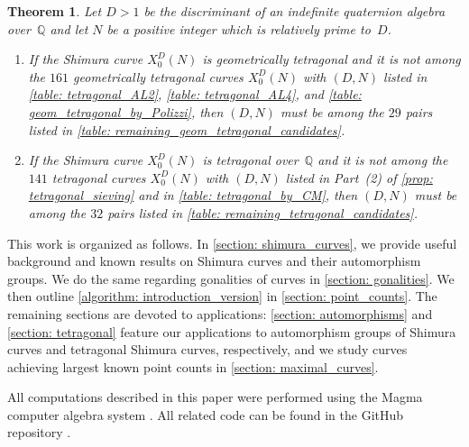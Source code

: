 \documentclass[11pt,reqno]{amsart}
\newcommand{\Q}{\mathbb{Q}}
\newtheorem{theorem}{Theorem}[section]
\theoremstyle{definition}
\begin{document}
\begin{theorem}\label{theorem: tetragonal_introduction}
Let $D>1$ be the discriminant of an indefinite quaternion algebra over~$\mathbb{Q}$ and let $N$ be a positive integer which is relatively prime to~$D$. 
\begin{enumerate}
    \item If the Shimura curve $X_0^D(N)$ is geometrically tetragonal and it is not among the $161$ geometrically tetragonal curves $X_0^D(N)$ with $(D,N)$ listed in \cref{table: tetragonal_AL2}, \cref{table: tetragonal_AL4}, and \cref{table: geom_tetragonal_by_Polizzi}, then $(D,N)$ must be among the $29$ pairs listed in \cref{table: remaining_geom_tetragonal_candidates}. 
    \item If the Shimura curve $X_0^D(N)$ is tetragonal over~$\Q$ and it is not among the $141$ tetragonal curves $X_0^D(N)$ with $(D,N)$ listed in Part~(2) of \cref{prop: tetragonal_sieving} and in \cref{table: tetragonal_by_CM}, then $(D,N)$ must be among the $32$ pairs listed in \cref{table: remaining_tetragonal_candidates}. 
\end{enumerate}
\end{theorem}

This work is organized as follows. In \cref{section: shimura_curves}, we provide useful background and known results on Shimura curves and their automorphism groups. We do the same regarding gonalities of curves in \cref{section: gonalities}. We then outline \cref{algorithm: introduction_version} in \cref{section: point_counts}. The remaining sections are devoted to applications: \cref{section: automorphisms} and \cref{section: tetragonal} feature our applications to automorphism groups of Shimura curves and tetragonal Shimura curves, respectively, and we study curves achieving largest known point counts in \cref{section: maximal_curves}.

All computations described in this paper were performed using the Magma computer algebra system \cite{Magma}. All related code can be found in the GitHub repository \cite{MPSSRep}.



\end{document}
